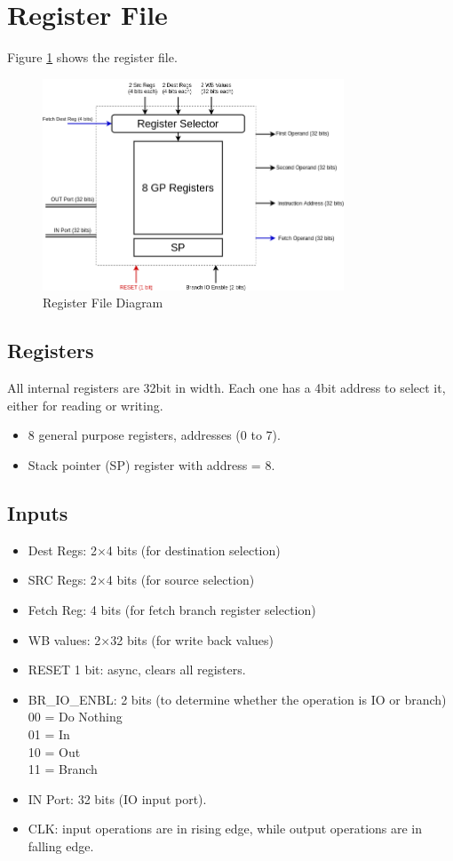 \section{Register File}
Figure \ref{fig:reg_file} shows the register file.
\begin{figure}[hp]
    \centering
    \includegraphics[width=0.8\textwidth]{images/reg_file.png}
    \caption{Register File Diagram}
    \label{fig:reg_file}
\end{figure}

\subsection{Registers}
All internal registers are 32bit in width. Each one has a 4bit address to select it, either for reading or writing.
\begin{itemize}
    \item 8 general purpose registers, addresses (0 to 7).
    \item Stack pointer (SP) register with address = 8.
\end{itemize}

\subsection{Inputs}
\begin{itemize}
    \item Dest Regs: 2$\times$4 bits (for destination selection)
    \item SRC Regs: 2$\times$4 bits (for source selection)
    \item Fetch Reg: 4 bits (for fetch branch register selection)
    \item WB values: 2$\times$32 bits (for write back values)
    \item RESET 1 bit: async, clears all registers.
    \item BR\_IO\_ENBL: 2 bits (to determine whether the operation is IO or branch)\\
    00 = Do Nothing\\
    01 = In\\
    10 = Out\\
    11 = Branch\\
    \item IN Port: 32 bits (IO input port).
    \item CLK: input operations are in rising edge, while output operations are in falling edge.
\end{itemize}

